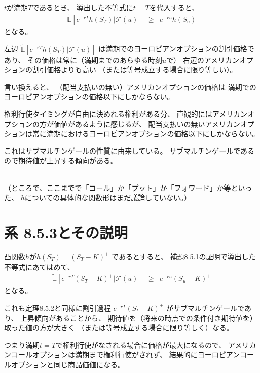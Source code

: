 \documentclass[uplatex,a4j,12pt,dvipdfmx]{jsarticle}
\begin{document}
$t$が満期$T$であるとき、
導出した不等式に$t=T$を代入すると、
%
%
\begin{eqnarray*}
	\tilde{\mathbb{E}} \left[
		e^{-rT} h(S_{T})
		\Big| \mathcal{F}(u)
		\right]
	&\geq&
	e^{-ru}
	h(S_{u})
\end{eqnarray*}
%
%
となる。

左辺
$
	\tilde{\mathbb{E}} \left[
		e^{-rT} h(S_{T})
		\Big| \mathcal{F}(u)
		\right]
$
は満期でのヨーロピアンオプションの割引価格であり、
その価格は常に（満期までのあらゆる時刻$u$で）
右辺のアメリカンオプションの割引価格よりも高い
（または等号成立する場合に限り等しい）。

言い換えると、
（配当支払いの無い）アメリカンオプションの価格は
満期でのヨーロピアンオプションの価格以下にしかならない。

権利行使タイミングが自由に決めれる権利がある分、
直観的にはアメリカンオプションの方が価値があるように感じるが、
配当支払いの無いアメリカンオプションは常に満期におけるヨーロピアンオプションの価格以下にしかならない。

これはサブマルチンゲールの性質に由来している。
サブマルチンゲールであるので期待値が上昇する傾向がある。


\ \\

（ところで、ここまでで「コール」か「プット」か「フォワード」か等といった、
$h$についての具体的な関数形はまだ議論していない。）


\section{系 8.5.3\cite{Shreve2004}とその説明}

凸関数$h$が$h(S_{T}) = (S_{T} - K)^{+}$
であるとすると、
補題8.5.1の証明で導出した不等式にあてはめて、
%
%
\begin{eqnarray*}
	\tilde{\mathbb{E}} \left[
		e^{-rT} (S_{T} - K)^{+}
		\Big| \mathcal{F}(u)
		\right]
	&\geq&
	e^{-ru}
	(S_{u} - K)^{+}
\end{eqnarray*}
%
%
となる。

これも定理8.5.2と同様に割引過程
$e^{-rT} (S_{t} - K)^{+}$
がサブマルチンゲールであり、
上昇傾向があることから、
期待値を（将来の時点での条件付き期待値を）取った値の方が大きく
（または等号成立する場合に限り等しく）なる。

つまり満期$t=T$で権利行使がなされる場合に価格が最大になるので、
アメリカンコールオプションは満期まで権利行使がされず、
結果的にヨーロピアンコールオプションと同じ商品価値になる。


\ \\
\end{document}
